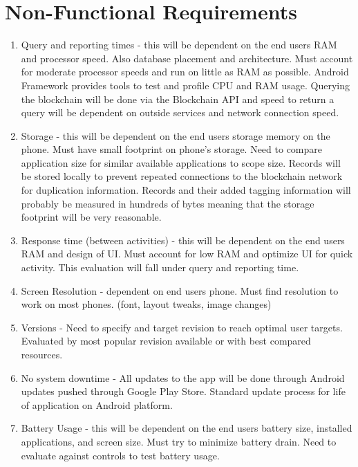 \section{Non-Functional Requirements}


\begin{enumerate}[label=4.\arabic*] 

\item Query and reporting times - this will be dependent on the end users RAM and processor speed. Also database placement and architecture. Must account for moderate processor speeds and run on little as RAM as possible. Android Framework provides tools to test and profile CPU and RAM usage. Querying the blockchain will be done via the Blockchain API and speed to return a query will be dependent on outside services and network connection speed.

\item Storage - this will be dependent on the end users storage memory on the phone. Must have small footprint on phone’s storage. Need to compare application size for similar available applications to scope size. Records will be stored locally to prevent repeated connections to the blockchain network for duplication information. Records and their added tagging information will probably be measured in hundreds of bytes meaning that the storage footprint will be very reasonable.

\item Response time (between activities) - this will be dependent on the end users RAM and design of UI.  Must account for low RAM and optimize UI for quick activity. This evaluation will fall under query and reporting time. 

\item Screen Resolution - dependent on end users phone. Must find resolution to work on most phones. (font, layout tweaks, image changes)

\item Versions - Need to specify and target revision to reach optimal user targets. Evaluated by most popular revision available or with best compared resources. 

\item No system downtime - All updates to the app will be done through Android updates pushed through Google Play Store. Standard update process for life of application on Android platform. 

\item Battery Usage - this will be dependent on the end users battery size, installed applications, and screen size. Must try to minimize battery drain. Need to evaluate against controls to test battery usage. 
\end{enumerate}
